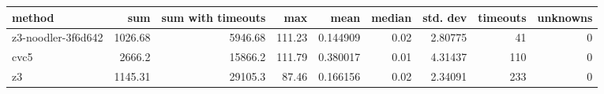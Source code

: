 \begin{tabular}{lrrrrrrrr}
\hline
 method             &     sum &   sum with timeouts &    max &     mean &   median &   std. dev &   timeouts &   unknowns \\
\hline
 z3-noodler-3f6d642 & 1026.68 &             5946.68 & 111.23 & 0.144909 &     0.02 &    2.80775 &         41 &          0 \\
 cvc5               & 2666.2  &            15866.2  & 111.79 & 0.380017 &     0.01 &    4.31437 &        110 &          0 \\
 z3                 & 1145.31 &            29105.3  &  87.46 & 0.166156 &     0.02 &    2.34091 &        233 &          0 \\
\hline
\end{tabular}
